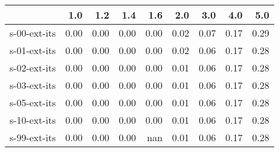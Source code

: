 \begin{tabular}{lrrrrrrrr}
\toprule
{} &  1.0 &  1.2 &  1.4 &  1.6 &  2.0 &  3.0 &  4.0 &  5.0 \\
\midrule
s-00-ext-its & 0.00 & 0.00 & 0.00 & 0.00 & 0.02 & 0.07 & 0.17 & 0.29 \\
s-01-ext-its & 0.00 & 0.00 & 0.00 & 0.00 & 0.02 & 0.06 & 0.17 & 0.28 \\
s-02-ext-its & 0.00 & 0.00 & 0.00 & 0.00 & 0.01 & 0.06 & 0.17 & 0.28 \\
s-03-ext-its & 0.00 & 0.00 & 0.00 & 0.00 & 0.01 & 0.06 & 0.17 & 0.28 \\
s-05-ext-its & 0.00 & 0.00 & 0.00 & 0.00 & 0.01 & 0.06 & 0.17 & 0.28 \\
s-10-ext-its & 0.00 & 0.00 & 0.00 & 0.00 & 0.01 & 0.06 & 0.17 & 0.28 \\
s-99-ext-its & 0.00 & 0.00 & 0.00 &  nan & 0.01 & 0.06 & 0.17 & 0.28 \\
\bottomrule
\end{tabular}
